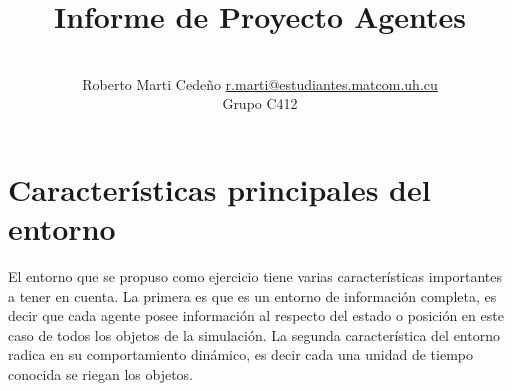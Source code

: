\documentclass[a4paper,10pt,twocolumn]{article}
\title{Informe de Proyecto Agentes}
\author{\\
	\name Roberto Marti Cede\~no \email \href{mailto:r.marti@estudiantes.matcom.uh.cu}{r.marti@estudiantes.matcom.uh.cu}
	\\ \addr Grupo C412
}
\begin{document}



\section{Características principales del entorno}\label{sec:intro}
	El entorno que se propuso como ejercicio tiene varias características importantes a tener en cuenta. La primera es que es un entorno de información completa, es decir que cada agente posee información al respecto del estado o posición en este caso de todos los objetos de la simulación. La segunda característica del entorno radica en su comportamiento dinámico, es decir cada una unidad de tiempo conocida se riegan los objetos.
	
\end{document}
